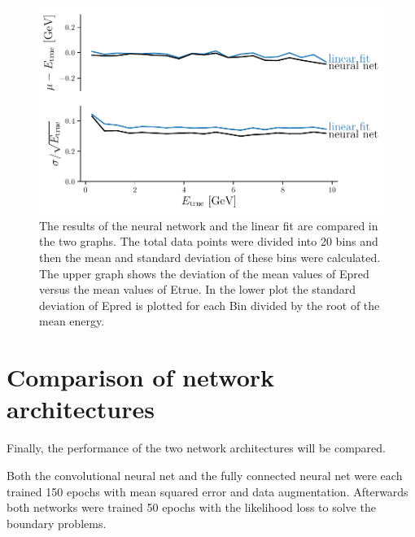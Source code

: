 \documentclass[12pt, a4paper]{thesis}
\begin{document}
\begin{figure}[htbp]
\centering
\includegraphics[width=.9\linewidth]{../images/likelihood_res.pdf}
\caption{\label{fig:orgac188af}
The results of the neural network and the linear fit are compared in the two graphs. The total data points were divided into 20 bins and then the mean and standard deviation of these bins were calculated. The upper graph shows the deviation of the mean values of Epred versus the mean values of Etrue. In the lower plot the standard deviation of Epred is plotted for each Bin divided by the root of the mean energy.}
\end{figure}

\section{Comparison of network architectures}
\label{sec:org1df3a0b}

Finally, the performance of the two network architectures will be compared.

Both the convolutional neural net and the fully connected neural net
were each trained 150 epochs with mean squared error and data
augmentation. Afterwards both networks were trained 50 epochs with the
likelihood loss to solve the boundary problems.
\end{document}
